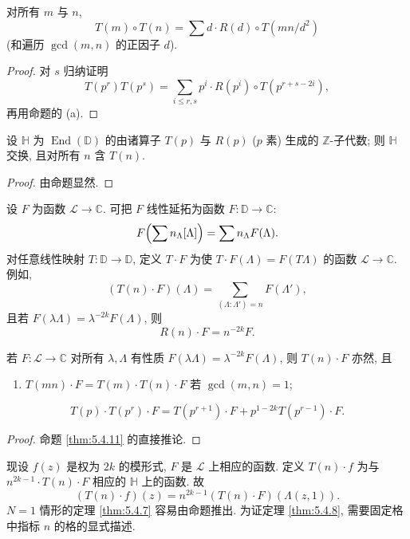 \begin{corollary} \label{thm:5.4.12}
对所有 $m$ 与 $n$,
\[
T(m)\circ T(n) = \sum d\cdot R(d)\circ T(mn/d^2)
\]
(和遍历 $\gcd(m, n)$ 的正因子 $d$).
\end{corollary}

\begin{proof}
对 $s$ 归纳证明
\[
T(p^r)T(p^s) = \sum_{i\le r, s}p^i\cdot R(p^i)\circ T(p^{r+s-2i}),
\]
再用命题的 (a).
\end{proof}

\begin{corollary} \label{thm:5.4.13}
设 $\mathbb{H}$ 为 $\operatorname{End}(\mathbb{D})$ 的由诸算子 $T(p)$ 与 $R(p)$ ($p$ 素) 生成的 $\mathbb{Z}$-子代数; 则 $\mathbb{H}$ 交换, 且对所有 $n$ 含 $T(n)$.
\end{corollary}

\begin{proof}
由命题显然.
\end{proof}

设 $F$ 为函数 $\mathcal{L}\to\mathbb{C}$. 可把 $F$ 线性延拓为函数 $F\colon\mathbb{D}\to\mathbb{C}$:
\[
F\Bigl(\sum n_\Lambda[\Lambda]\Bigr) = \sum n_\Lambda F(\Lambda).
\]
对任意线性映射 $T\colon\mathbb{D}\to\mathbb{D}$, 定义 $T\cdot F$ 为使 $T\cdot F(\Lambda) = F(T\Lambda)$ 的函数 $\mathcal{L}\to\mathbb{C}$. 例如,
\[
(T(n)\cdot F)(\Lambda) = \sum_{(\Lambda:\Lambda') = n}F(\Lambda'),
\]
且若 $F(\lambda\Lambda) = \lambda^{-2k}F(\Lambda)$, 则
\[
R(n)\cdot F = n^{-2k}F.
\]

\begin{proposition} \label{thm:5.4.14}
若 $F\colon\mathcal{L}\to\mathbb{C}$ 对所有 $\lambda, \Lambda$ 有性质 $F(\lambda\Lambda) = \lambda^{-2k}F(\Lambda)$, 则 $T(n)\cdot F$ 亦然, 且
\begin{enumerate}[label=\textup{(\alph*)}]
\item $T(mn)\cdot F = T(m)\cdot T(n)\cdot F$ 若 $\gcd(m, n) = 1$;
\end{enumerate}
\[
T(p)\cdot T(p^r)\cdot F = T(p^{r+1})\cdot F + p^{1-2k}T(p^{r-1})\cdot F.
\]
\end{proposition}

\begin{proof}
命题 \ref{thm:5.4.11} 的直接推论.
\end{proof}

现设 $f(z)$ 是权为 $2k$ 的模形式, $F$ 是 $\mathcal{L}$ 上相应的函数. 定义 $T(n)\cdot f$ 为与 $n^{2k-1}\cdot T(n)\cdot F$ 相应的 $\mathbb{H}$ 上的函数. 故
\[
(T(n)\cdot f)(z) = n^{2k-1}(T(n)\cdot F)(\Lambda(z, 1)).
\]
$N = 1$ 情形的定理 \ref{thm:5.4.7} 容易由命题推出. 为证定理 \ref{thm:5.4.8}, 需要固定格中指标 $n$ 的格的显式描述.

